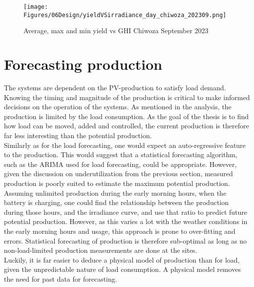 \begin{figure}
  \centering
    \texttt{[image: Figures/06Design/yieldVSirradiance\_day\_chiwoza\_202309.png]}
    \caption[Yield vs irradiance September 2023]{Average, max and min yield vs GHI Chiwoza September 2023}
    \label{fig:yieldVSirradiance_day_chiwoza_202309}
\end{figure}


\section{Forecasting production}\label{seq:prod_forecasting}
The systems are dependent on the PV-production to satisfy load demand.  Knowing the timing and magnitude of the production is critical to make informed decisions on the operation of the systems. As mentioned in the analysis, the production is limited by the load consumption. As the goal of the thesis is to find how load can be moved, added and controlled, the current production is therefore far less interesting than the potential production.\\



Similarly as for the load forecasting, one would expect an auto-regressive feature to the production. This would suggest that a statistical forecasting algorithm, such as the ARIMA used for load forecasting, could be appropriate. However, given the discussion on underutilization from the previous section, measured production is poorly suited to estimate the maximum potential production. Assuming unlimited production during the early morning hours, when the battery is charging, one could find the relationship between the production during those hours, and the irradiance curve, and use that ratio to predict future potential production. However, as this varies a lot with the weather conditions in the early morning hours and usage, this approach is prone to over-fitting and errors. Statistical forecasting of production is therefore sub-optimal as long as no non-load-limited production measurements are done at the sites.\\

Luckily, it is far easier to deduce a physical model of production than for load, given the unpredictable nature of load consumption. A physical model removes the need for past data for forecasting. 

